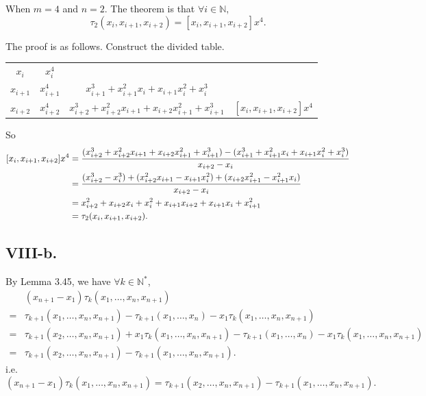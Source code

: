 \documentclass[a4paper]{article}
\begin{document}
When $m=4$ and $n=2$. The theorem is that $\forall i\in\mathbb{N},$
$$
\tau_{2}(x_{i},x_{i+1},x_{i+2})=[x_{i},x_{i+1},x_{i+2}]x^{4}.
$$

The proof is as follows. Construct the divided table.

\begin{table}[H]
  \centering
  \begin{tabular}{c|ccc}
    $x_{i}$ & $x_{i}^4$ & &  \\
    $x_{i+1}$ & $x_{i+1}^4$ & $x_{i+1}^3+x_{i+1}^{2}x_{i}+x_{i+1}x_{i}^{2}+x_{i}^3$ &   \\
    $x_{i+2}$ & $x_{i+2}^4$ & $x_{i+2}^3+x_{i+2}^{2}x_{i+1}+x_{i+2}x_{i+1}^{2}+x_{i+1}^3$ & $[x_{i},x_{i+1},x_{i+2}]x^{4}$  \\
  \end{tabular}
\end{table}

So
$$
\begin{aligned}
  \relax [x_{i},x_{i+1},x_{i+2}]x^{4}&=\dfrac{(x_{i+2}^3+x_{i+2}^{2}x_{i+1}+x_{i+2}x_{i+1}^{2}+x_{i+1}^3)-(x_{i+1}^3+x_{i+1}^{2}x_{i}+x_{i+1}x_{i}^{2}+x_{i}^3)}{x_{i+2}-x_{i}}\\
  &=\dfrac{(x_{i+2}^3-x_{i}^3)+(x_{i+2}^{2}x_{i+1}-x_{i+1}x_{i}^{2})+(x_{i+2}x_{i+1}^{2}-x_{i+1}^{2}x_{i})}{x_{i+2}-x_{i}}\\
  &=x_{i+2}^2+x_{i+2}x_{i}+x_{i}^2+x_{i+1}x_{i+2}+x_{i+1}x_{i}+x_{i+1}^2\\
  &=\tau_{2}(x_{i},x_{i+1},x_{i+2}).
\end{aligned}
$$

\subsection*{VIII-b.}
By Lemma 3.45, we have $\forall k\in \mathbb{N}^{*}$, 
$$
\begin{aligned}
  &(x_{n+1}-x_{1})\tau_{k}(x_{1},\ldots,x_{n},x_{n+1})\\
  =&\tau_{k+1}(x_{1},\ldots,x_{n},x_{n+1})-\tau_{k+1}(x_{1},\ldots,x_{n})-x_{1}\tau_{k}(x_{1},\ldots,x_{n},x_{n+1})\\
  =&\tau_{k+1}(x_{2},\ldots,x_{n},x_{n+1})+x_{1}\tau_{k}(x_{1},\ldots,x_{n},x_{n+1})-\tau_{k+1}(x_{1},\ldots,x_{n})-x_{1}\tau_{k}(x_{1},\ldots,x_{n},x_{n+1})\\
  =&\tau_{k+1}(x_{2},\ldots,x_{n},x_{n+1})-\tau_{k+1}(x_{1},\ldots,x_{n},x_{n+1}).
\end{aligned}
$$
i.e. 
\begin{equation} \label{eq:8.2}
  (x_{n+1}-x_{1})\tau_{k}(x_{1},\ldots,x_{n},x_{n+1}) = \tau_{k+1}(x_{2},\ldots,x_{n},x_{n+1}) - \tau_{k+1}(x_{1},\ldots,x_{n},x_{n+1}).
\end{equation}
\end{document}
